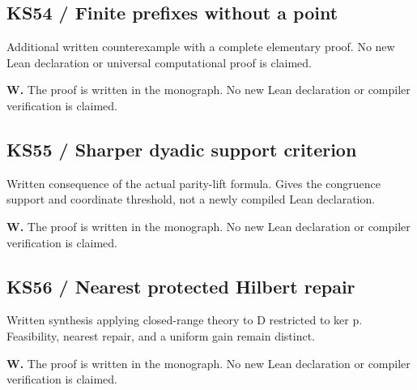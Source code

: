 \par\noindent\begin{minipage}{\linewidth}\subsection*{KS54 / Finite prefixes without a point}
Additional written counterexample with a complete elementary proof. No new Lean declaration or universal computational proof is claimed.
\par\smallskip\noindent\textbf{W.} The proof is written in the monograph. No new Lean declaration or compiler verification is claimed.
\smallskip\noindent{\color{KomorebiMuted}\rule{\linewidth}{.3pt}}\par\end{minipage}\par\medskip
{}
\par\noindent\begin{minipage}{\linewidth}\subsection*{KS55 / Sharper dyadic support criterion}
Written consequence of the actual parity-lift formula. Gives the congruence support and coordinate threshold, not a newly compiled Lean declaration.
\par\smallskip\noindent\textbf{W.} The proof is written in the monograph. No new Lean declaration or compiler verification is claimed.
\smallskip\noindent{\color{KomorebiMuted}\rule{\linewidth}{.3pt}}\par\end{minipage}\par\medskip
{}
\par\noindent\begin{minipage}{\linewidth}\subsection*{KS56 / Nearest protected Hilbert repair}
Written synthesis applying closed-range theory to D restricted to ker p. Feasibility, nearest repair, and a uniform gain remain distinct.
\par\smallskip\noindent\textbf{W.} The proof is written in the monograph. No new Lean declaration or compiler verification is claimed.
\smallskip\noindent{\color{KomorebiMuted}\rule{\linewidth}{.3pt}}\par\end{minipage}\par\medskip
